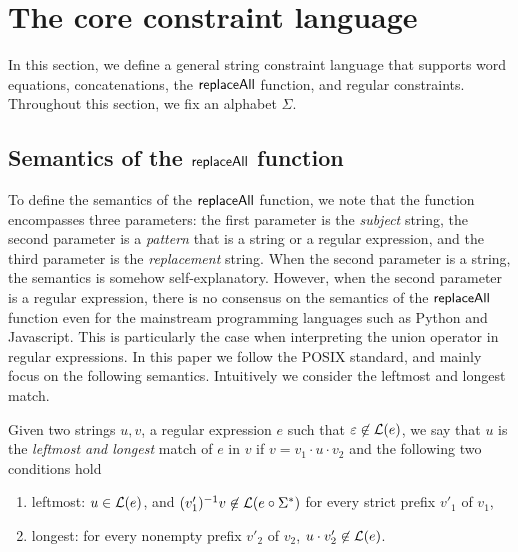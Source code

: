 
\section{The core constraint language}\label{sec-core}

In this section, we define a general string constraint language that supports word equations, concatenations, the $\mathsf{replaceAll}$ function, and regular constraints.  Throughout this section, we fix an alphabet $\Sigma$.



\subsection{Semantics of the $\mathsf{replaceAll}$ function}
To define the semantics of the $\mathsf{replaceAll}$ function, we note that the function encompasses three parameters: the first parameter is the \emph{subject} string, the second parameter is a \emph{pattern} that is a string or a regular expression, and the third parameter is the \emph{replacement} string.  
When the second parameter is a string, the semantics is somehow self-explanatory. However, when the second parameter is a regular expression, there is no consensus on the semantics of the $\mathsf{replaceAll}$ function even for the mainstream programming languages such as Python and Javascript.
 This is particularly the case when interpreting the union operator in regular expressions. In this paper we follow the POSIX standard, and mainly focus on the following semantics. Intuitively we consider the leftmost and longest match. 


\begin{definition}
Given two strings $u,v$, a regular expression $e$ such that $\varepsilon \not \in \mathcal{L}(e)$, we say that $u$ is the \emph{leftmost and longest} match of $e$ in $v$ if $v=v_1\cdot u \cdot v_2$ and the following two conditions hold
\begin{enumerate}
	\item leftmost: $u \in \mathcal{L}(e)$,  and $(v'_1)^{-1} v \not \in  \mathcal{L}(e \circ \Sigma^*)$ for every strict prefix $v'_1$ of $v_1$, 
	\item longest: for every nonempty prefix $v'_2$ of $v_2$, $u \cdot v'_2 \not \in \mathcal{L}(e)$.
\end{enumerate} 
\end{definition}

